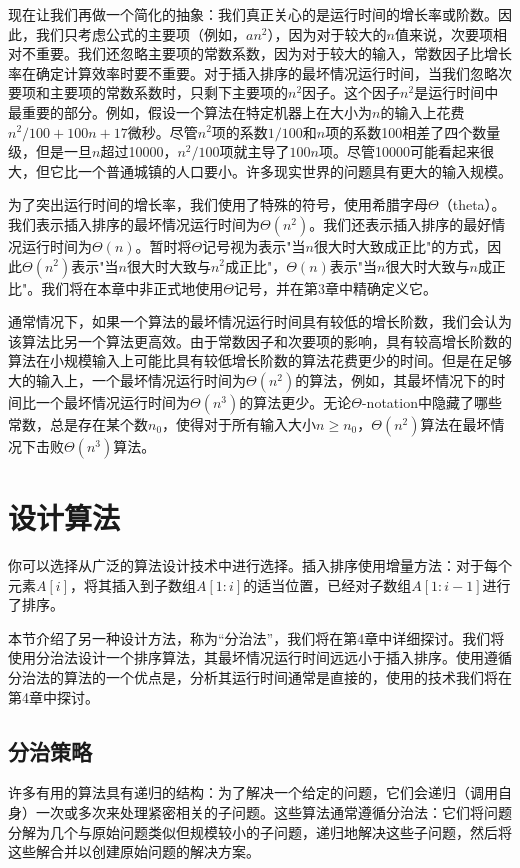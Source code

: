 \documentclass[lang=cn,newtx,10pt,scheme=chinese]{elegantbook}
\begin{document}
现在让我们再做一个简化的抽象：我们真正关心的是运行时间的增长率或阶数。因此，我们只考虑公式的主要项（例如，$an^2$），因为对于较大的$n$值来说，次要项相对不重要。我们还忽略主要项的常数系数，因为对于较大的输入，常数因子比增长率在确定计算效率时要不重要。对于插入排序的最坏情况运行时间，当我们忽略次要项和主要项的常数系数时，只剩下主要项的$n^2$因子。这个因子$n^2$是运行时间中最重要的部分。例如，假设一个算法在特定机器上在大小为$n$的输入上花费$n^2/100 + 100n + 17$微秒。尽管$n^2$项的系数$1/100$和$n$项的系数100相差了四个数量级，但是一旦$n$超过10000，$n^2/100$项就主导了$100n$项。尽管10000可能看起来很大，但它比一个普通城镇的人口要小。许多现实世界的问题具有更大的输入规模。

为了突出运行时间的增长率，我们使用了特殊的符号，使用希腊字母$\Theta$（theta）。我们表示插入排序的最坏情况运行时间为$\Theta(n^2)$。我们还表示插入排序的最好情况运行时间为$\Theta(n)$。暂时将$\Theta$记号视为表示"当$n$很大时大致成正比"的方式，因此$\Theta(n^2)$表示"当$n$很大时大致与$n^2$成正比"，$\Theta(n)$表示"当$n$很大时大致与$n$成正比"。我们将在本章中非正式地使用$\Theta$记号，并在第3章中精确定义它。

通常情况下，如果一个算法的最坏情况运行时间具有较低的增长阶数，我们会认为该算法比另一个算法更高效。由于常数因子和次要项的影响，具有较高增长阶数的算法在小规模输入上可能比具有较低增长阶数的算法花费更少的时间。但是在足够大的输入上，一个最坏情况运行时间为$\Theta(n^2)$的算法，例如，其最坏情况下的时间比一个最坏情况运行时间为$\Theta(n^3)$的算法更少。无论$\Theta$-notation中隐藏了哪些常数，总是存在某个数$n_0$，使得对于所有输入大小$n\ge n_0$，$\Theta(n^2)$算法在最坏情况下击败$\Theta(n^3)$算法。

\section{设计算法}

你可以选择从广泛的算法设计技术中进行选择。插入排序使用增量方法：对于每个元素$A[i]$，将其插入到子数组$A[1:i]$的适当位置，已经对子数组$A[1:i-1]$进行了排序。

本节介绍了另一种设计方法，称为``分治法''，我们将在第4章中详细探讨。我们将使用分治法设计一个排序算法，其最坏情况运行时间远远小于插入排序。使用遵循分治法的算法的一个优点是，分析其运行时间通常是直接的，使用的技术我们将在第4章中探讨。

\subsection{分治策略}

许多有用的算法具有递归的结构：为了解决一个给定的问题，它们会递归（调用自身）一次或多次来处理紧密相关的子问题。这些算法通常遵循分治法：它们将问题分解为几个与原始问题类似但规模较小的子问题，递归地解决这些子问题，然后将这些解合并以创建原始问题的解决方案。
\end{document}
